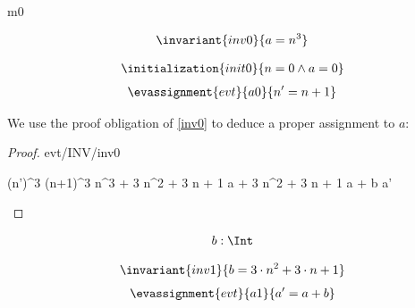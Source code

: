 \documentclass[12pt]{amsart}
\title{}
\author{}
\date{} %
\begin{document}
\maketitle
\tableofcontents


\begin{machine}{m0}


\begin{align*}
\invariant{inv0}
{	a = n^3	}
\end{align*}
%


%
\begin{align*}
\initialization{init0}
{	n = 0 \land a = 0	}
\end{align*}
%
%
\begin{align*}
\evassignment{evt}{a0}
{	n' = n + 1	}
\end{align*}

We use the proof obligation of \ref{inv0} to deduce a proper assignment to $a$:

\begin{proof}{evt/INV/inv0}
	\begin{calculation}
		(n')^3
	\hint{=}{ \ref{a0} }
		(n+1)^3
		n^3 + 3 \cdot n^2 + 3 \cdot n + 1
	\hint{=}{ \ref{inv0} }
		a + 3 \cdot n^2 + 3 \cdot n + 1
		a + b
	\hint{=}{ \ref{a1} }
		a'
	\end{calculation}
\end{proof}

\begin{align*}
\variable{	b : \Int}
\end{align*}

\begin{align*}
\invariant{inv1}
{	b = 3 \cdot n^2 + 3 \cdot n + 1	}
\end{align*}
\begin{align*}
\evassignment{evt}{a1}
{	a' = a + b	}
\end{align*}


\end{machine}
\end{document}
